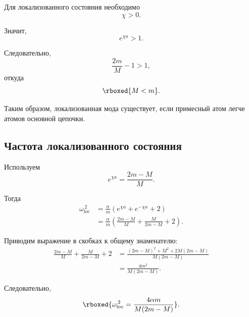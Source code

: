 \documentclass[../final.tex]{subfiles}
\begin{document}
Для локализованного состояния необходимо
%
\begin{equation*}
    \chi>0.
\end{equation*}

Значит,
%
\begin{equation*}
    e^{\chi a}>1.
\end{equation*}

Следовательно,
%
\begin{equation*}
    \frac{2m}{M}-1>1,
\end{equation*}
%
откуда
%
\begin{equation*}
    \rboxed{
        M<m
    }.
\end{equation*}

Таким образом, локализованная мода существует,
если примесный атом легче атомов основной цепочки.



\subsection*{Частота локализованного состояния}

Используем
%
\begin{equation*}
    e^{\chi a}
    =
    \frac{2m-M}{M}.
\end{equation*}

Тогда
%
\begin{align*}
    \omega_{\mathrm{loc}}^{\,2}
    &=
    \frac{\alpha}{m}
    \left(
        e^{\chi a}
        +
        e^{-\chi a}
        +
        2
    \right)
    \\
    &=
    \frac{\alpha}{m}
    \left(
        \frac{2m-M}{M}
        +
        \frac{M}{2m-M}
        +
        2
    \right).
\end{align*}

Приводим выражение в скобках к общему знаменателю:
%
\begin{align*}
    \frac{2m-M}{M}
    +
    \frac{M}{2m-M}
    +
    2
    &=
    \frac{
        (2m-M)^2
        +
        M^2
        +
        2M(2m-M)
    }{
        M(2m-M)
    }
    \\
    &=
    \frac{4m^2}{
        M(2m-M)
    }.
\end{align*}

Следовательно,
%
\begin{equation*}
    \rboxed{
        \omega_{\mathrm{loc}}^{\,2}
        =
        \frac{
            4\alpha m
        }{
            M(2m-M)
        }
    }.
\end{equation*}
\end{document}
